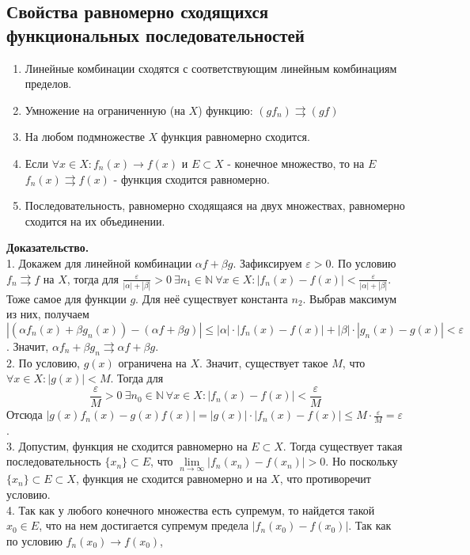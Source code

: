 \subsection{Свойства равномерно сходящихся функциональных последовательностей}
\begin{enumerate}
    \item Линейные комбинации сходятся с соответствующим линейным комбинациям
        пределов. 
    \item Умножение на ограниченную (на $X$) функцию:  $(gf_n)\rightrightarrows
        (gf)$
    \item На любом подмножестве $X$ функция равномерно сходится. 
    \item Если  $\forall x\in X: f_n(x)\to f(x)$ и $E\subset X$ - конечное 
        множество, то на $E$ $f_n(x)\rightrightarrows f(x)$ - 
        функция сходится равномерно.
\item Последовательность, равномерно сходящаяся на двух множествах, равномерно
        сходится на их объединении.
\end{enumerate}
\textbf{Доказательство.}\\
1. Докажем для линейной комбинации $\alpha f+\beta g$. 
Зафиксируем $\varepsilon>0$. По условию $f_n\rightrightarrows f$ на $X$,
тогда для  $\frac{\varepsilon}{|\alpha|+|\beta|}>0~\exists n_1\in\mathbb{N}~
\forall x\in X:|f_n(x)-f(x)|<\frac{\varepsilon}{|\alpha|+|\beta|}$. 
Тоже самое для функции $g$. Для неё существует константа $n_2$. Выбрав 
максимум из них, получаем
$$|(\alpha f_n(x)+\beta g_n(x))-(\alpha f+\beta g)|\leqslant |\alpha|\cdot 
|f_n(x)-f(x)|+|\beta|\cdot |g_n(x)-g(x)|<\varepsilon$$.
Значит, $\alpha f_n+\beta g_n\rightrightarrows\alpha f+\beta g$.\\
2. По условию, $g(x)$ ограничена на  $X$. Значит, существует такое $M$, что
$\forall x\in X:|g(x)|<M$. Тогда для
$$\frac{\varepsilon}{M}>0~\exists n_0\in \mathbb{N}~\forall x\in X:
|f_n(x)-f(x)|<\frac{\varepsilon}{M}$$ 
Отсюда $|g(x)f_n(x)-g(x)f(x)|=|g(x)|\cdot |f_n(x)-f(x)|\leqslant M\cdot 
\frac{\varepsilon}{M}=\varepsilon$.\\
3. Допустим, функция не сходится равномерно
на $E\subset X$. Тогда существует такая 
последовательность $\{x_n\}\subset E$, что $\lim\limits_{n \to \infty} 
|f_n(x_n)-f(x_n)|>0$. Но поскольку $\{x_n\}\subset E\subset X$, функция 
не сходится равномерно и на $X$, что противоречит условию.\\
4. Так как у любого конечного множества 
есть супремум, то найдется такой $x_0\in E$, что на нем достигается
супремум предела $|f_n(x_0)-f(x_0)|$. Так как по условию $f_n(x_0)\to f(x_0)$,
